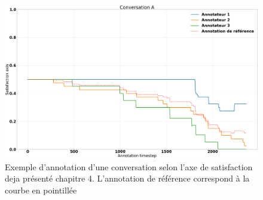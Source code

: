 \begin{figure}[h]
  \centering
  \includegraphics[width=15cm]{./Chapitre7/figures/annotTroisGold.png}
  \caption{Exemple d'annotation d'une conversation selon l'axe de satisfaction deja présenté chapitre 4. L'annotation de référence correspond à la courbe en pointillée}
  \label{fig:annotTroisGold}
\end{figure}

